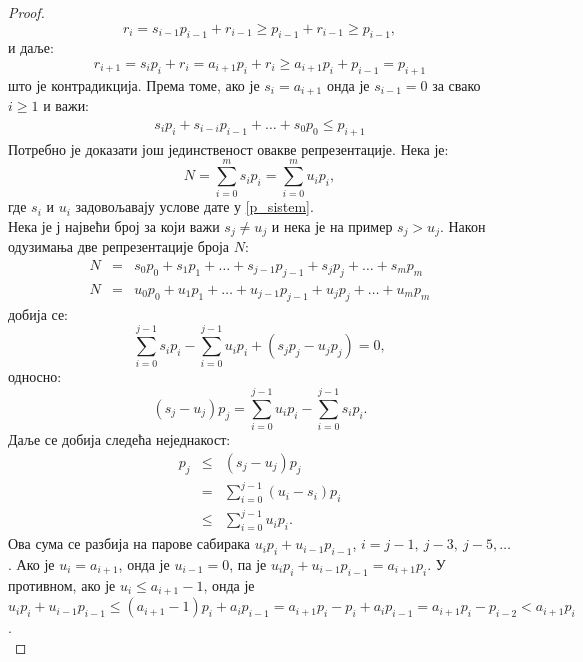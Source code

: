 \documentclass[a4paper]{article}
\begin{document}
\begin{proof}
		\begin{displaymath}
			r_{i} = s_{i-1}p_{i-1} + r_{i-1} \geq p_{i-1} + r_{i-1} \geq p_{i-1},
		\end{displaymath}
	и даље:
		\begin{displaymath}
			r_{i+1} = s_{i}p_{i} + r_{i} = a_{i+1}p_{i} + r_{i} \geq a_{i+1}p_{i} + p_{i-1} = p_{i+1}
		\end{displaymath}
	што је контрадикција. Према томе, ако је $ s_{i} = a_{i+1} $ онда је $ s_{i-1} = 0 $ за свако $ i \ge 1 $ и важи:	
		\begin{eqnarray}
			\label{nejednakost} s_{i}p_{i} + s_{i-i}p_{i-1} + \ldots + s_{0}p_{0} \le p_{i+1}
		\end{eqnarray}
	Потребно је доказати још јединственост овакве репрезентације. Нека је:	
		\begin{displaymath}
			N = \sum_{i=0}^{m} s_{i}p_{i}  = \sum_{i=0}^{m} u_{i}p_{i},
		\end{displaymath}	
	где $ s_{i} $ и $ u_{i} $ задовољавају услове дате у \eqref{p_sistem}.\\
	Нека је $ ј $ највећи број за који важи $ s_{j} \neq u_{j} $ и нека је на пример $ s_{j} > u_{j} $. 
	Након одузимања две репрезентације броја $ N $:
		\begin{eqnarray*}
			N &=& s_{0}p_{0} + s_{1}p_{1} + \ldots + s_{j-1}p_{j-1} + s_{j}p_{j} + \ldots + s_{m}p_{m}\\		
			N &=& u_{0}p_{0} + u_{1}p_{1} + \ldots + u_{j-1}p_{j-1} + u_{j}p_{j} + \ldots + u_{m}p_{m}
		\end{eqnarray*}	
	добија се:	
		\begin{displaymath}
			\sum_{i=0}^{j-1} s_{i}p_{i} - \sum_{i=0}^{j-1} u_{i}p_{i} + (s_{j}p_{j}  - u_{j}p_{j}) = 0,
		\end{displaymath}
	односно:
		\begin{displaymath}
			(s_{j} - u_{j})p_{j} = \sum_{i=0}^{j-1} u_{i}p_{i} - \sum_{i=0}^{j-1} s_{i}p_{i}.
		\end{displaymath}
	Даље се добија следећа неједнакост:
		\begin{eqnarray*}
			p_{j} &\leq& (s_{j} - u_{j})p_{j}\\
			&=& \sum_{i=0}^{j-1} (u_{i} - s_{i})p_{i}\\
			&\leq& \sum_{i=0}^{j-1} u_{i}p_{i}.
		\end{eqnarray*}
	Ова сума се разбија на парове сабирака $ u_{i}p_{i} + u_{i-1}p_{i-1} $, $ i = j-1,\ j-3,\ j-5,\ldots $. Ако је $ u_{i} = a_{i+1} $, онда је $ u_{i-1} = 0 $, па је $ u_{i}p_{i} + u_{i-1}p_{i-1} = a_{i+1}p_{i} $. У противном, ако је $ u_{i} \le a_{i+1} - 1 $, онда је $ u_{i}p_{i} + u_{i-1}p_{i-1} \le (a_{i+1} - 1)p_{i} + a_{i}p_{i-1} = a_{i+1}p_{i} - p_{i} + a_{i}p_{i-1} = a_{i+1}p_{i} - p_{i-2} < a_{i+1}p_{i} $.\\

\end{proof}
\end{document}

